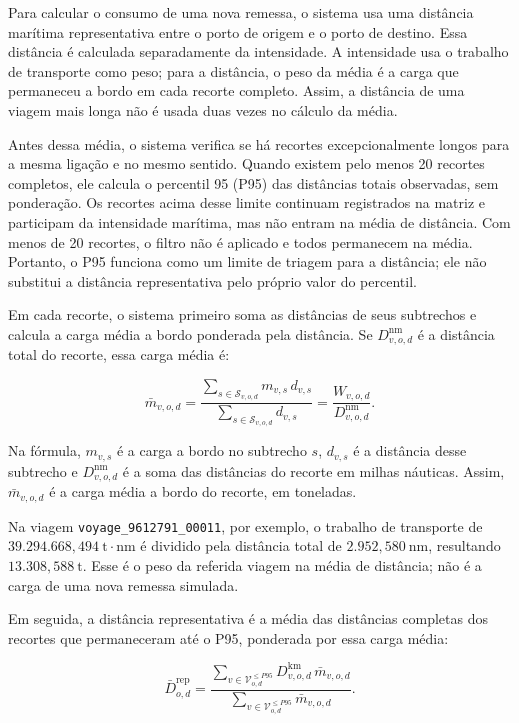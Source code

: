 \documentclass[brazil,]{article}
\begin{document}
Para calcular o consumo de uma nova remessa, o sistema usa uma distância
marítima representativa entre o porto de origem e o porto de destino.
Essa distância é calculada separadamente da intensidade. A intensidade
usa o trabalho de transporte como peso; para a distância, o peso da
média é a carga que permaneceu a bordo em cada recorte completo. Assim,
a distância de uma viagem mais longa não é usada duas vezes no cálculo
da média.

Antes dessa média, o sistema verifica se há recortes excepcionalmente
longos para a mesma ligação e no mesmo sentido. Quando existem pelo
menos 20 recortes completos, ele calcula o percentil 95 (P95) das
distâncias totais observadas, sem ponderação. Os recortes acima desse
limite continuam registrados na matriz e participam da intensidade
marítima, mas não entram na média de distância. Com menos de 20
recortes, o filtro não é aplicado e todos permanecem na média. Portanto,
o P95 funciona como um limite de triagem para a distância; ele não
substitui a distância representativa pelo próprio valor do percentil.

Em cada recorte, o sistema primeiro soma as distâncias de seus
subtrechos e calcula a carga média a bordo ponderada pela distância. Se
\(D_{v,o,d}^{\mathrm{nm}}\) é a distância total do recorte, essa carga
média é:

\[
\bar m_{v,o,d}=
\frac{\sum_{s\in\mathcal{S}_{v,o,d}}m_{v,s}\,d_{v,s}}
{\sum_{s\in\mathcal{S}_{v,o,d}}d_{v,s}}
=\frac{W_{v,o,d}}{D_{v,o,d}^{\mathrm{nm}}}.
\]

Na fórmula, \(m_{v,s}\) é a carga a bordo no subtrecho \(s\),
\(d_{v,s}\) é a distância desse subtrecho e \(D_{v,o,d}^{\mathrm{nm}}\)
é a soma das distâncias do recorte em milhas náuticas. Assim,
\(\bar m_{v,o,d}\) é a carga média a bordo do recorte, em toneladas.

Na viagem \texttt{voyage\_9612791\_00011}, por exemplo, o trabalho de
transporte de \(39.294.668{,}494\ \mathrm{t\cdot nm}\) é dividido pela
distância total de \(2.952{,}580\ \mathrm{nm}\), resultando
\(13.308{,}588\ \mathrm{t}\). Esse é o peso da referida viagem na média
de distância; não é a carga de uma nova remessa simulada.

Em seguida, a distância representativa é a média das distâncias
completas dos recortes que permaneceram até o P95, ponderada por essa
carga média:

\[
\bar D_{o,d}^{\mathrm{rep}}=
\frac{\sum_{v\in\mathcal{V}_{o,d}^{\leq P95}}D_{v,o,d}^{\mathrm{km}}\,\bar m_{v,o,d}}
{\sum_{v\in\mathcal{V}_{o,d}^{\leq P95}}\bar m_{v,o,d}}.
\]
\end{document}
